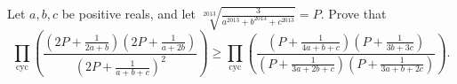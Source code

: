 Let $a, b, c$ be positive reals, and let $\sqrt[2013]{\frac{3}{a^{2013}+b^{2013}+c^{2013}}}=P$. Prove that
\[\prod_{\text{cyc}}\left(\frac{(2P+\frac{1}{2a+b})(2P+\frac{1}{a+2b})}{(2P+\frac{1}{a+b+c})^2}\right)\ge \prod_{\text{cyc}}\left(\frac{(P+\frac{1}{4a+b+c})(P+\frac{1}{3b+3c})}{(P+\frac{1}{3a+2b+c})(P+\frac{1}{3a+b+2c})}\right).\]